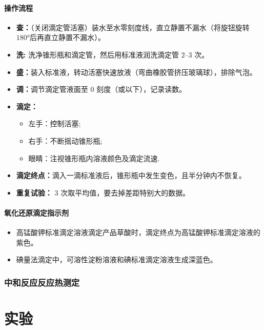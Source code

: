 \documentclass[10pt]{article}
\begin{document}
	\paragraph{操作流程}
	
	\begin{itemize}
		\item \textbf{查：}（关闭滴定管活塞）装水至水零刻度线，直立静置不漏水（将旋钮旋转$\ang{180}$后再直立静置不漏水）。
		\item \textbf{洗: }洗净锥形瓶和滴定管，然后用标准液润洗滴定管 $2\text{--}3$ 次。
		\item \textbf{盛：}装入标准液，转动活塞快速放液（弯曲橡胶管挤压玻璃球），排除气泡。
		\item \textbf{调：}调节滴定管液面至 $0$ 刻度（或以下），记录读数。
		\item \textbf{滴定：}
		\begin{itemize}
			\item 左手：控制活塞;
			\item 右手：不断摇动锥形瓶;
			\item 眼睛：注视锥形瓶内溶液颜色及滴定流速.
		\end{itemize}
		\item \textbf{滴定终点：}滴入一滴标准液后，锥形瓶中发生变色，且半分钟内不恢复。
		\item \textbf{重复试验：} $3$ 次取平均值，要去掉差距特别大的数据。
	\end{itemize}
	
	\paragraph{氧化还原滴定指示剂}
	
	\begin{itemize}
		\item 高锰酸钾标准滴定溶液滴定产品草酸时，滴定终点为高锰酸钾标准滴定溶液的紫色。
		\item 碘量法滴定中，可溶性淀粉溶液和碘标准滴定溶液生成深蓝色。
	\end{itemize}
	
	\subsubsection{中和反应反应热测定}
	
	
	\clearpage
	\section{实验}
	
\end{document}

